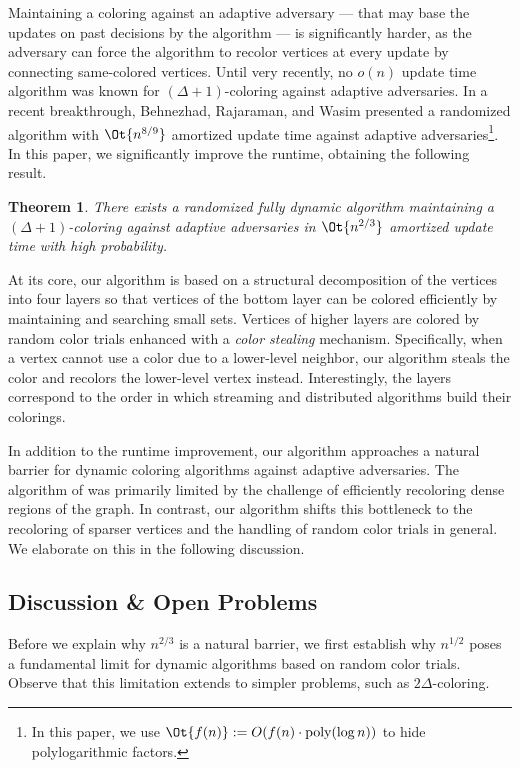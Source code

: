 \documentclass[a4paper,english,11pt]{amsart}
\newtheorem{theorem}{Theorem}
\theoremstyle{definition}
\newcommand{\poly}{\mbox{\rm poly}}
\begin{document}
Maintaining a coloring against an adaptive adversary --- that may base the updates on past decisions by the algorithm --- is significantly harder, as the adversary can force the algorithm to recolor vertices at every update by connecting same-colored vertices.
Until very recently, no $o(n)$ update time algorithm was known for $(\Delta+1)$-coloring against adaptive adversaries.
In a recent breakthrough, Behnezhad, Rajaraman, and Wasim \cite{BRW24} presented a randomized algorithm with $\Ot{ n^{8/9} }$ amortized update time against adaptive adversaries\footnote{In this paper, we use $\Ot{f(n)} := O(f(n) \cdot \poly(\log n))$ to hide polylogarithmic factors.}. 
In this paper, we significantly improve the runtime, obtaining the following result.
\smallskip

\begin{theorem}
    \label{thm:main}
    There exists a randomized fully dynamic algorithm maintaining a $(\Delta+1)$-coloring against adaptive adversaries in $\Ot{ n^{2/3} }$ amortized update time with high probability.
\end{theorem}

At its core, our algorithm is based on a structural decomposition of the vertices into four layers so that vertices of the bottom layer can be colored efficiently by maintaining and searching small sets. Vertices of higher layers are colored by random color trials enhanced with a \emph{color stealing} mechanism. 
Specifically, when a vertex cannot use a color due to a lower-level neighbor, our algorithm steals the color and recolors the lower-level vertex instead.
Interestingly, the layers correspond to the order in which streaming and distributed algorithms build their colorings.


In addition to the runtime improvement, our algorithm approaches a natural barrier for dynamic coloring algorithms against adaptive adversaries. 
The algorithm of \cite{BRW24} was primarily limited by the challenge of efficiently recoloring dense regions of the graph.
In contrast, our algorithm shifts this bottleneck to the recoloring of sparser vertices and the handling of random color trials in general. We elaborate on this in the following discussion.


\subsection{Discussion \& Open Problems}

Before we explain why $n^{2/3}$ is a natural barrier, we first establish why $n^{1/2}$ poses a fundamental limit for dynamic algorithms based on random color trials. 
Observe that this limitation extends to simpler problems, such as $2\Delta$-coloring.
\end{document}
